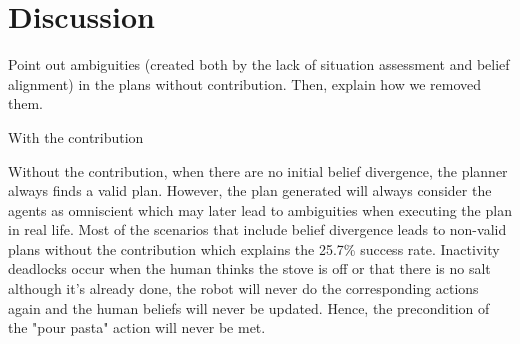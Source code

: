 \documentclass[letterpaper]{article} %
\begin{document}



\section{Discussion}

Point out ambiguities (created both by the lack of situation assessment and belief alignment) in the plans without contribution. Then, explain how we removed them. 

With the contribution 

Without the contribution, when there are no initial belief divergence, the planner always finds a valid plan. However, the plan generated will always consider the agents as omniscient which may later lead to ambiguities when executing the plan in real life. Most of the scenarios that include belief divergence leads to non-valid plans without the contribution which explains the 25.7\% success rate. Inactivity deadlocks occur when the human thinks the stove is off or that there is no salt although it's already done, the robot will never do the corresponding actions again and the human beliefs will never be updated. Hence, the precondition of the "pour pasta" action will never be met.
\end{document}
